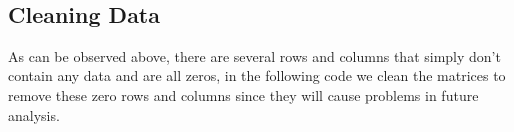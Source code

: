 \documentclass[11pt]{article}
\begin{document}
    \begin{center}
    \end{center}
    { \hspace*{\fill} \\}
    
    \subsection{Cleaning Data}\label{cleaning-data}

As can be observed above, there are several rows and columns that simply
don't contain any data and are all zeros, in the following code we clean
the matrices to remove these zero rows and columns since they will cause
problems in future analysis.
\end{document}
